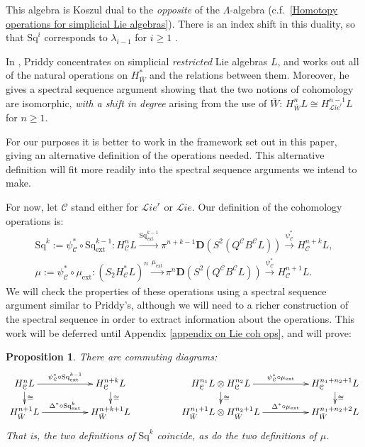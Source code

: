 \documentclass[11pt]{amsart} \renewcommand{\baselinestretch}{1.2}
\theoremstyle{plain}
\newtheorem{prop}[thm]{Proposition}
\theoremstyle{definition}
\renewcommand{\to}{\longrightarrow}
\newcommand{\scrL}{\mathscr{L}}
\newcommand{\calc}{\mathcal{C}}
\newcommand{\citeBOX}[2][]{\cite[\mbox{#1}]{#2}}
\newcommand{\ExtCohOp}{\mathrm{Sq}_\mathrm{ext}}
\newcommand{\ExtCohProd}{\mu_\mathrm{ext}}
\newcommand{\Sq}{\mathrm{Sq}}
\newcommand{\liealgs}{{\scrL\!\textit{ie}}}
\newcommand{\restliealgs}{{\scrL\!\textit{ie}^\textit{r}}}
\newcommand{\dual}{\mathbf{D}}
\begin{document}
\begin{Constructing cohomology operations}
This algebra is Koszul dual to the \emph{opposite} of the $\Lambda$-algebra (c.f.\ \ref{Homotopy operations for simplicial Lie algebras}). There is an index shift in this duality, so that $\Sq^i$ corresponds to $\lambda_{i-1}$ for $i\geq1$ \citeBOX[\S7.1]{PriddyKoszul.pdf}.

In \cite{PriddySimplicialLie.pdf}, Priddy concentrates on simplicial \emph{restricted} Lie algebras $L$, and works out all of the natural operations on $H^*_{\bar{W}}$ and the relations between them. Moreover, he gives a spectral sequence argument showing that the two notions of cohomology are isomorphic, \emph{with a shift in degree} arising from the use of $\bar{W}$: $H_{\bar{W}}^nL\cong H^{n-1}_{\restliealgs}L$ for $n\geq1$.

For our purposes it is better to work in the framework set out in this paper, giving an alternative definition of the operations needed. This alternative definition will fit more readily into the spectral sequence arguments we intend to make. 

For now, let $\calc$ stand either for $\restliealgs$ or $\liealgs$. Our definition of the cohomology operations is:
\begin{gather*}
\Sq^k:=\psi^*_{\calc}\circ\ExtCohOp^{k-1}:H_\calc^{n}L\overset{\ExtCohOp^{k-1}}{\to} \pi^{n+k-1}\dual(S^2(Q^\calc B^\calc L))\overset{\psi_\calc^*}{\to} H_\calc^{n+k}L,\\
\mu:=\psi^*_{\calc}\circ\ExtCohProd:(S_2 H_\calc^{*}L)^{n}\overset{\ExtCohProd}{\to} \pi^{n}\dual(S^2(Q^\calc B^\calc L))\overset{\psi_\calc^*}{\to} H_\calc^{n+1}L.
\end{gather*}
We will check the properties of these operations using a spectral sequence argument similar to Priddy's, although we will need to a richer construction of the spectral sequence in order to extract information about the operations. This work will be deferred until Appendix \ref{appendix on Lie coh ops}, and will prove:
\begin{prop}
\label{all the lie steenrod ops are the same}
There are commuting diagrams:
\[\xymatrix@R=4mm@C=17mm{
H^n_\calc L
\ar[d]^-{\cong}
\ar[r]^-{\psi^*_{\calc}\circ\ExtCohOp^{k-1}}&%
H^{n+k}_\calc L
\ar[d]^-{\cong}
&
H^{n_1}_\calc L\otimes H^{n_2}_\calc L
\ar[d]^-{\cong}
\ar[r]^-{\psi^*_{\calc}\circ\ExtCohProd}&%
H^{n_1+n_2+1}_\calc L
\ar[d]^-{\cong}
\\%
H^{n+1}_{\bar{W}} L
\ar[r]^-{\Delta^*\circ\ExtCohOp^k}&%
H^{n+k+1}_{\bar{W}} L%
&
H^{n_1+1}_{\bar{W}} L\otimes H^{n_2+1}_{\bar{W}} L
\ar[r]^-{\Delta^*\circ\ExtCohProd}&%
H^{n_1+n_2+2}_{\bar{W}} L%
}\]
That is, the two definitions of $\Sq^k$ coincide, as do the two definitions of $\mu$.
\end{prop}


\end{Constructing cohomology operations}
\end{document}
